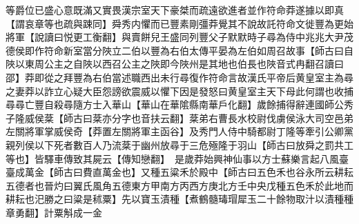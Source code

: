 等爵位已盛心意既滿又實畏漢宗室天下豪桀而疏遠欲進者並作符命莽遂據以即真【謂哀章等也疏與踈同】舜秀内懼而已豐素剛彊莽覺其不說故託符命文徙豐為更始將軍【說讀曰悦更工衡翻】與賣餅兒王盛同列豐父子默默時子尋為侍中兆兆大尹茂德侯即作符命新室當分陜立二伯以豐為右伯太傳平晏為左伯如周召故事【師古曰自陜以東周公主之自陜以西召公主之陜即今陜州是其地也伯長也陜音式冉翻召讀曰邵】莽即從之拜豐為右伯當述職西出未行尋復作符命言故漢氏平帝后黄皇室主為尋之妻莽以詐立心疑大臣怨謗欲震威以懼下因是發怒曰黄皇室主天下母此何謂也收捕尋尋亡豐自殺尋隨方士入華山【華山在華隂縣南華戶化翻】歲餘捕得辭連國師公秀子隆威侯棻【師古曰棻亦分字也音扶云翻】棻弟右曹長水校尉伐虜侯泳大司空邑弟左關將軍掌威侯奇【莽置左關將軍主函谷】及秀門人侍中騎都尉丁隆等牽引公卿黨親列侯以下死者數百人乃流棻于幽州放尋于三危殛隆于羽山【師古曰放舜之罰共工等也】皆驛車傳致其屍云【傳知戀翻】　是歲莽始興神仙事以方士蘇樂言起八風臺臺成萬金【師古曰費直萬金也】又種五粱禾於殿中【師古曰五色禾也谷永所云耕耘五德者也晉灼曰翼氏風角五德東方甲南方丙西方庚北方壬中央戊種五色禾於此地而耕耘也汜勝之曰粱是秫粟】先以寶玉漬種【煮鶴髓瑇瑁犀玉二十餘物取汁以漬種種章勇翻】計粟斛成一金

